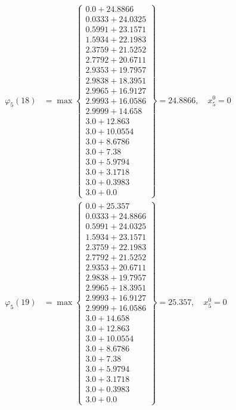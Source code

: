 \documentclass{article}
\begin{document}
\begin{align*}
\varphi_{5}(18) &= \max \left\{ \begin{array}{c}
0.0 + 24.8866 \\
 0.0333 + 24.0325 \\
 0.5991 + 23.1571 \\
 1.5934 + 22.1983 \\
 2.3759 + 21.5252 \\
 2.7792 + 20.6711 \\
 2.9353 + 19.7957 \\
 2.9838 + 18.3951 \\
 2.9965 + 16.9127 \\
 2.9993 + 16.0586 \\
 2.9999 + 14.658 \\
 3.0 + 12.863 \\
 3.0 + 10.0554 \\
 3.0 + 8.6786 \\
 3.0 + 7.38 \\
 3.0 + 5.9794 \\
 3.0 + 3.1718 \\
 3.0 + 0.3983 \\
 3.0 + 0.0
\end{array} \right\}=24.8866, \quad x_{5}^0=0\\
  
\varphi_{5}(19) &= \max \left\{ \begin{array}{c}
0.0 + 25.357 \\
 0.0333 + 24.8866 \\
 0.5991 + 24.0325 \\
 1.5934 + 23.1571 \\
 2.3759 + 22.1983 \\
 2.7792 + 21.5252 \\
 2.9353 + 20.6711 \\
 2.9838 + 19.7957 \\
 2.9965 + 18.3951 \\
 2.9993 + 16.9127 \\
 2.9999 + 16.0586 \\
 3.0 + 14.658 \\
 3.0 + 12.863 \\
 3.0 + 10.0554 \\
 3.0 + 8.6786 \\
 3.0 + 7.38 \\
 3.0 + 5.9794 \\
 3.0 + 3.1718 \\
 3.0 + 0.3983 \\
 3.0 + 0.0
\end{array} \right\}=25.357, \quad x_{5}^0=0\\
  

\end{align*}
\end{document}
